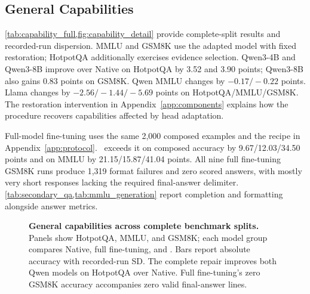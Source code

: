 \subsection{General Capabilities}

\cref{tab:capability_full,fig:capability_detail} provide complete-split results and recorded-run dispersion. MMLU and GSM8K use the adapted model with fixed restoration; HotpotQA additionally exercises evidence selection. Qwen3-4B and Qwen3-8B improve over Native on HotpotQA by 3.52 and 3.90 points; Qwen3-8B also gains 0.83 points on GSM8K. Qwen MMLU changes by $-0.17/-0.22$ points. Llama changes by $-2.56/-1.44/-5.69$ points on HotpotQA/MMLU/GSM8K. The restoration intervention in Appendix~\ref{app:components} explains how the procedure recovers capabilities affected by head adaptation.

Full-model fine-tuning uses the same 2,000 composed examples and the recipe in Appendix~\ref{app:protocol}. \method\ exceeds it on composed accuracy by 9.67/12.03/34.50 points and on MMLU by 21.15/15.87/41.04 points. All nine full fine-tuning GSM8K runs produce 1,319 format failures and zero scored answers, with mostly very short responses lacking the required final-answer delimiter. \cref{tab:secondary_qa,tab:mmlu_generation} report completion and formatting alongside answer metrics.

\begin{table}[!htbp]
  \centering
  \caption{\textbf{Complete capability evaluation with dispersion.} Accuracy (\%), mean $\pm$ sample SD over recorded runs; Native is measured once. HotpotQA uses its complete 7,405-example distractor validation split, MMLU its 14,042-example test split, and GSM8K its 1,319-example test split. Metrics and prompt conditions are defined in Appendix~\ref{app:protocol}.}
  \label{tab:capability_full}
  \small\setlength{\tabcolsep}{5pt}
  
\end{table}

\begin{figure}[!htbp]
  \centering
  \begin{minipage}{1\textwidth}\centering
  \par
  \caption{\textbf{General capabilities across complete benchmark splits.} Panels show HotpotQA, MMLU, and GSM8K; each model group compares Native, full fine-tuning, and \method. Bars report absolute accuracy with recorded-run SD. The complete repair improves both Qwen models on HotpotQA over Native. Full fine-tuning's zero GSM8K accuracy accompanies zero valid final-answer lines.}
  \label{fig:capability_detail}
\end{minipage}
\end{figure}

